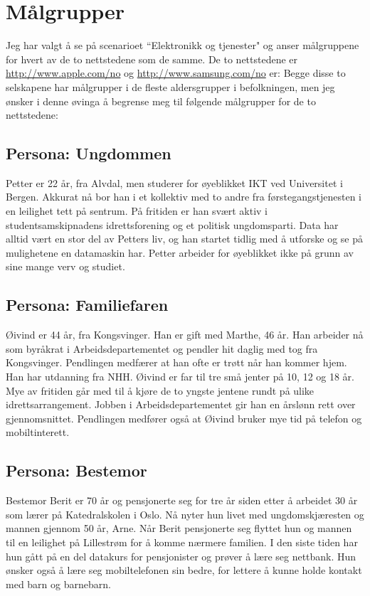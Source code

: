 \section{Målgrupper}

Jeg har valgt å se på scenarioet ``Elektronikk og tjenester" og anser målgruppene for hvert av de to nettstedene som de samme. De to nettstedene er  \url{http://www.apple.com/no} og \url{http://www.samsung.com/no} er:
 Begge disse to selskapene har målgrupper i de fleste aldersgrupper i befolkningen, men jeg ønsker i denne øvinga å begrense meg til følgende målgrupper for de to nettstedene:

\subsection{Persona: Ungdommen}

Petter er 22 år, fra Alvdal, men studerer for øyeblikket IKT ved Universitet i Bergen. Akkurat nå bor han i et kollektiv med to andre fra førstegangstjenesten i en leilighet tett på sentrum. På fritiden er han svært aktiv i studentsamskipnadens idrettsforening og et politisk ungdomsparti. Data har alltid vært en stor del av Petters liv, og han startet tidlig med å utforske og se på mulighetene en datamaskin har. Petter arbeider for øyeblikket ikke på grunn av sine mange verv og studiet. 

\subsection{Persona: Familiefaren}

Øivind er 44 år, fra Kongsvinger. Han er gift med Marthe, 46 år. Han arbeider nå som byråkrat i Arbeidsdepartementet og pendler hit daglig med tog fra Kongsvinger. Pendlingen medfærer at han ofte er trøtt når han kommer hjem. Han har utdanning fra NHH. Øivind er far til tre små jenter på 10, 12 og 18 år. Mye av fritiden går med til å kjøre de to yngste jentene rundt på ulike idrettsarrangement. Jobben i Arbeidsdepartementet gir han en årslønn rett over gjennomsnittet. Pendlingen medfører også at Øivind bruker mye tid på telefon og mobiltinterett. 

\subsection{Persona: Bestemor}

Bestemor Berit er 70 år og pensjonerte seg for tre år siden etter å arbeidet 30 år som lærer på Katedralskolen i Oslo. Nå nyter hun livet med ungdomskjæresten og mannen gjennom 50 år, Arne. Når Berit pensjonerte seg flyttet hun og mannen til en leilighet på Lillestrøm for å komme nærmere familien. I den siste tiden har hun gått på en del datakurs for pensjonister og prøver å lære seg nettbank. Hun ønsker også å lære seg mobiltelefonen sin bedre, for lettere å kunne holde kontakt med barn og barnebarn.  